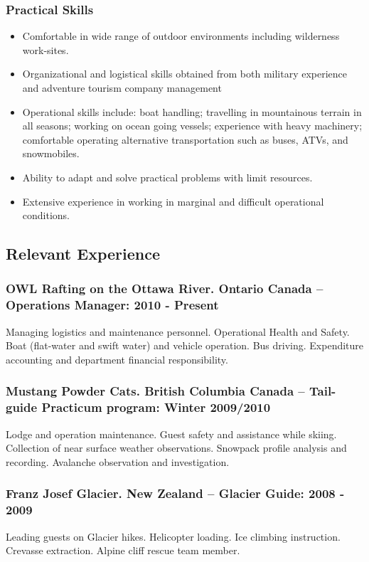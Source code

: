 \documentclass[]{article}
\begin{document}
\subsubsection*{Practical Skills}
\begin{itemize}
\item Comfortable in wide range of outdoor environments including wilderness work-sites. 
\item Organizational and logistical skills obtained from both military experience and adventure tourism company management
\item Operational skills include: boat handling; travelling in mountainous terrain in all seasons; working on ocean going vessels; experience with heavy machinery; comfortable operating alternative transportation such as buses, ATVs, and snowmobiles.  
\item Ability to adapt and solve practical problems with limit resources.
\item Extensive experience in working in marginal and difficult operational conditions.
\end{itemize}

\subsection*{Relevant Experience}
\subsubsection*{OWL Rafting on the Ottawa River. Ontario Canada – Operations Manager: 2010 - Present}
Managing logistics and maintenance personnel. Operational Health and Safety. Boat (flat-water and swift water) and vehicle operation. Bus driving. Expenditure accounting and department financial responsibility.
\subsubsection*{Mustang Powder Cats. British Columbia Canada – Tail-guide Practicum program: Winter 2009/2010}
Lodge and operation maintenance. Guest safety and assistance while skiing. Collection of near surface weather observations. Snowpack profile analysis and recording. Avalanche observation and investigation. 
 \subsubsection*{Franz Josef Glacier. New Zealand – Glacier Guide: 2008 - 2009}
Leading guests on Glacier hikes. Helicopter loading. Ice climbing instruction. Crevasse extraction. Alpine
cliff rescue team member.
\end{document}
